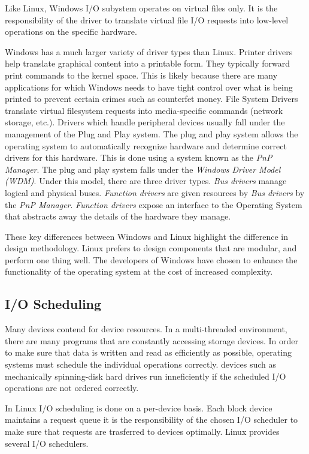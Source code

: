 \documentclass[onecolumn,10pt]{IEEETran}
\begin{document}
  Like Linux, Windows I/O subystem operates on virtual files only.  It is the responsibility of the driver to translate virtual file I/O requests into low-level operations on the specific hardware.

  Windows has a much larger variety of driver types than Linux.  Printer drivers  help translate graphical content into a printable form.  They typically forward print commands to the kernel space.  This is likely because there are many applications for which Windows needs to have tight control over what is being printed to prevent certain crimes such as counterfet money.  File System Drivers translate virtual filesystem requests into media-specific commands (network storage, etc.).
	Drivers which handle peripheral devices usually fall under the management of the Plug and Play system.  The plug and play system allows the operating system to automatically recognize hardware and determine correct drivers for this hardware.  This is done using a system known as the \textit{PnP Manager}.  The plug and play system falls under the \textit{Windows Driver Model (WDM)}.  Under this model,  there are three driver types.  \textit{Bus drivers} manage logical and physical buses.  \textit{Function drivers} are given resources by \textit{Bus drivers} by the \textit{PnP Manager}.  \textit{Function drivers} expose an interface to the Operating System that abstracts away the details of the hardware they manage.

These key differences between Windows and Linux highlight the difference in design methodology.  Linux prefers to design components that are modular, and perform one thing well.  The developers of Windows have chosen to enhance the functionality of the operating system at the cost of increased complexity.

\subsection {I/O Scheduling}

Many devices contend for device resources.  In a multi-threaded environment, there are many programs that are constantly accessing storage devices.  In order to make sure that data is written and read as efficiently as possible, operating systems must schedule the individual operations correctly.  devices such as mechanically spinning-disk hard drives run inneficiently if the scheduled I/O operations are not ordered correctly.

In Linux I/O scheduling is done on a per-device basis.  Each block device maintains a request queue it is the responsibility of the chosen I/O scheduler to make sure that requests are trasferred to devices optimally.  Linux provides several I/O schedulers.\cite{lkd}
\end{document}
